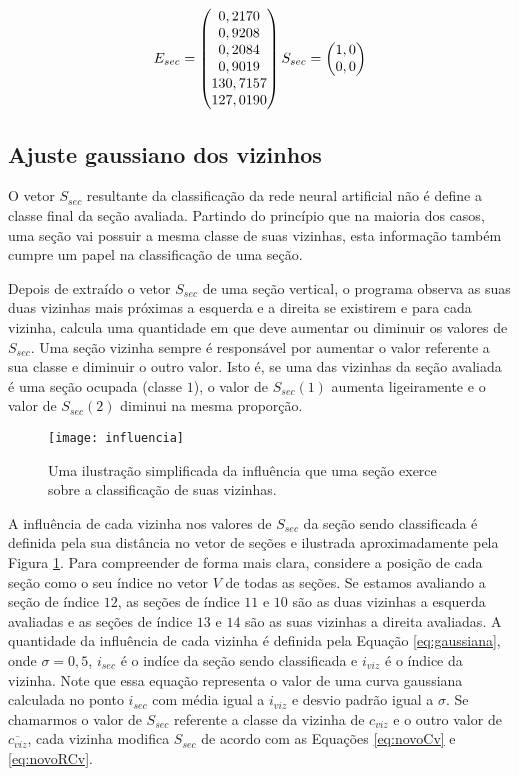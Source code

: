 \begin{equation}
\centering
	E_{sec} = \begin{pmatrix}
	0,2170\\0,9208\\0,2084\\0,9019\\130,7157\\127,0190
	\end{pmatrix}
	S_{sec} = \begin{pmatrix}
	1,0\\0,0
	\end{pmatrix}
\centering
\label{eq:vetoresRede}
\end{equation}


\subsection{Ajuste gaussiano dos vizinhos}

O vetor $S_{sec}$ resultante da classificação da rede neural artificial não é define a classe final da seção avaliada. Partindo do princípio que na maioria dos casos, uma seção vai possuir a mesma classe de suas vizinhas, esta informação também cumpre um papel na classificação de uma seção. 

Depois de extraído o vetor $S_{sec}$ de uma seção vertical, o programa observa as suas duas vizinhas mais próximas a esquerda e a direita se existirem e para cada vizinha, calcula uma quantidade em que deve aumentar ou diminuir os valores de $S_{sec}$. Uma seção vizinha sempre é responsável por aumentar o valor referente a sua classe e diminuir o outro valor. Isto é, se uma das vizinhas da seção avaliada é uma seção ocupada (classe $1$), o valor de $S_{sec}(1)$ aumenta ligeiramente e o valor de $S_{sec}(2)$ diminui na mesma proporção.

\begin{figure}
\centering
\texttt{[image: influencia]}
\caption{Uma ilustração simplificada da influência que uma seção exerce sobre a classificação de suas vizinhas.}
\label{fig:influencia}
\centering
\end{figure}


A influência de cada vizinha nos valores de $S_{sec}$ da seção sendo classificada é definida pela sua distância no vetor de seções e ilustrada aproximadamente pela Figura \ref{fig:influencia}. Para compreender de forma mais clara, considere a posição de cada seção como o seu índice no vetor $V$ de todas as seções. Se estamos avaliando a seção de índice $12$, as seções de índice $11$ e $10$ são as duas vizinhas a esquerda avaliadas e as seções de índice $13$ e $14$ são as suas vizinhas a direita avaliadas. A quantidade da influência de cada vizinha é definida pela Equação \ref{eq:gaussiana}, onde $\sigma = 0,5$, $i_{sec}$ é o indíce da seção sendo classificada e $i_{viz}$ é o índice da vizinha. Note que essa equação representa o valor de uma curva gaussiana calculada no ponto $i_{sec}$ com média igual a $i_{viz}$ e desvio padrão igual a $\sigma$. Se chamarmos o valor de $S_{sec}$ referente a classe da vizinha de $c_{viz}$ e o outro valor de $\overline{c_{viz}}$, cada vizinha modifica $S_{sec}$ de acordo com as Equações \ref{eq:novoCv} e \ref{eq:novoRCv}.

